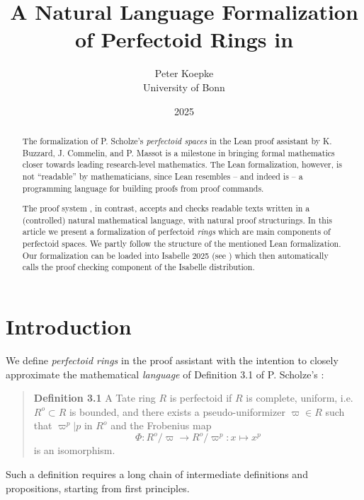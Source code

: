 \documentclass[english,11pt]{article}
\title{A Natural Language Formalization of Perfectoid Rings in \Naproche}
\author{Peter Koepke\\
University of Bonn}
\date{2025}
\begin{document}
\maketitle

\begin{abstract}
   The formalization of P. Scholze's \emph{perfectoid spaces} 
   \cite{Scholze2012}
   in the Lean proof assistant \cite{Lean}
   by K. Buzzard, J. Commelin, and P. Massot \cite{BuzzardCommelinMassot2019} is a milestone in bringing 
   formal mathematics closer towards leading research-level mathematics. 
   The Lean formalization, however, is not ``readable'' by mathematicians, 
   since Lean resembles -- and indeed is -- a programming language 
   for building proofs from proof commands.

   The \Naproche proof system
   \cite{DeLonKoepkeLorenzenMartiSchuetzWenzel2021}, in contrast, accepts and checks 
   readable texts written in a 
   (controlled) natural mathematical language, with natural proof structurings. 
   In this article we present a \Naproche formalization of perfectoid \emph{rings} 
   which are main components of perfectoid spaces. We partly follow the structure 
   of the mentioned Lean formalization. Our formalization can be loaded 
   into Isabelle 2025
   (see \cite{Isabelle}) which then automatically calls the \Naproche proof checking 
   component of the Isabelle distribution.
\end{abstract}

\newpage
\tableofcontents
\newpage

\section*{Introduction}

We define \textit{perfectoid rings} in the proof assistant \Naproche \cite{DeLonKoepkeLorenzenMartiSchuetzWenzel2021} 
with the intention to closely approximate the mathematical 
\textit{language} 
of Definition 3.1 of
P. Scholze's \cite{Scholze2022}:
\begin{quote}
\textbf{Definition 3.1} A Tate ring $R$ is perfectoid if $R$ is complete, uniform,
i.e. $R^o \subset R$ is bounded, and there exists a
pseudo-uniformizer $\varpi \in R$ such that $\varpi^p | p$ in $R^o$ and the
Frobenius map
\[\Phi: R^o/\varpi \rightarrow R^o/\varpi^p : x \mapsto x^p\]
is an isomorphism.
\end{quote}
Such a definition requires a long chain of intermediate definitions
and propositions, starting from first principles.
\end{document}
